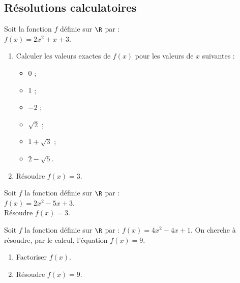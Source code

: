 \subsection{R\'esolutions calculatoires}
\begin{multicols}{2}
\begin{exo}
Soit la fonction $f$ d\'efinie sur $\R$ par : \\$f(x)=2x^2+x+3$.
\begin{enumerate}
	\item Calculer les valeurs exactes de $f(x)$ pour les valeurs de $x$ suivantes :
	  \vspace{-1em}\begin{multicols}{3}
	  \begin{itemize}
	    \item 0 ;
	    \item 1 ;
	    \item $-2$ ;
	    \item $\sqrt{2}$ ;
	    \item $1+\sqrt{3}$ ;
	    \item $2-\sqrt{5}$.
	   \end{itemize}
	  \end{multicols}\vspace{-1em}
	\item R\'esoudre $f(x)=3$.
\end{enumerate}
\end{exo}

\begin{exo}
Soit $f$ la fonction d\'efinie sur $\R$ par :\\ $f(x)=2x^2-5x+3$. \\R\'esoudre $f(x)=3$.
\end{exo}

\begin{exo} Soit $f$ la fonction d\'efinie sur $\R$ par : $f(x)=4x^2-4x+1$. On cherche \`a r\'esoudre, par le calcul, l'\'equation $f(x)=9$.
\begin{enumerate}
	\item Factoriser $f(x)$.
	\item R\'esoudre $f(x)=9$.
\end{enumerate}%
\end{exo}




\end{multicols}
